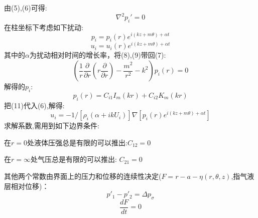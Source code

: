 \documentclass[UTF8]{gapd}
\begin{document}
由(5),(6)可得:
\begin{equation}
\nabla ^2p_i'=0
\end{equation}
在柱坐标下考虑如下扰动:
	\begin{equation}
p_{i}=p_{i}(r) e^{i(k z+m \theta)+\alpha t} 
\end{equation}
\begin{equation}
u_{i}=u_{i}(r) e^{i(k z+m \theta)+\alpha t}
\end{equation}
其中的$\alpha$为扰动相对时间的增长率，将(8),(9)带回(7):
\begin{equation}
\left(\frac{1}{r} \frac{\partial}{\partial r} (r \frac{\partial}{\partial r})-\frac{m^{2}}{r^{2}}-k^{2}\right) p_{i}(r)=0
\end{equation}
解得的$p_{i}$:
\begin{equation}
p_{i}(r)=C_{i 1} I_{m}(k r)+C_{i 2} K_{m}(k r)
\end{equation}
把(11)代入(6),解得:
\begin{equation}
{u}_{i}=-1 /\left[\rho_{i}\left(\alpha+i k U_{i}\right)\right] \nabla\left[p_{i}(r) e^{i(k z+m \theta)+\alpha t}\right]
\end{equation}
求解系数,需用到如下边界条件:

在$r=0$处液体压强总是有限的可以推出:$C_{12}=0$

在$r=\infty $处气压总是有限的可以推出: $C_{21}=0$

其他两个常数由界面上的压力和位移的连续性决定($F=r-a-\eta(r, \theta, z)$,指气液层相对位移)：
\begin{equation}
p'_1-p'_2=\Delta p_{\sigma}
\end{equation}
\begin{equation}
\frac{dF}{dt}=0
\end{equation}
\end{document}
